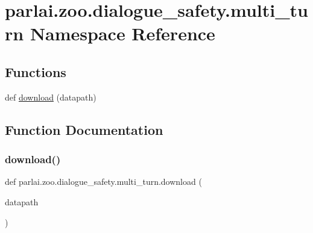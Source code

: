 \hypertarget{namespaceparlai_1_1zoo_1_1dialogue__safety_1_1multi__turn}{}\section{parlai.\+zoo.\+dialogue\+\_\+safety.\+multi\+\_\+turn Namespace Reference}
\label{namespaceparlai_1_1zoo_1_1dialogue__safety_1_1multi__turn}
\subsection*{Functions}
\begin{DoxyCompactItemize}
\item 
def \hyperlink{namespaceparlai_1_1zoo_1_1dialogue__safety_1_1multi__turn_ae081830ac93e63d15483d78b7417cf45}{download} (datapath)
\end{DoxyCompactItemize}


\subsection{Function Documentation}
\mbox{\label{namespaceparlai_1_1zoo_1_1dialogue__safety_1_1multi__turn_ae081830ac93e63d15483d78b7417cf45}} 
\subsubsection{\texorpdfstring{download()}{download()}}
{\footnotesize\ttfamily def parlai.\+zoo.\+dialogue\+\_\+safety.\+multi\+\_\+turn.\+download (\begin{DoxyParamCaption}\item[{}]{datapath }\end{DoxyParamCaption})}

